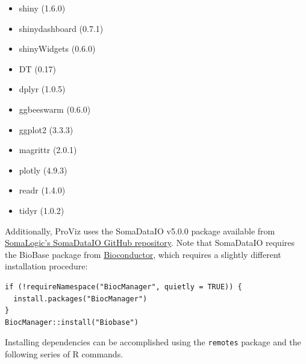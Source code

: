 \documentclass[
]{book}
\providecommand{\tightlist}{%
  \setlength{\itemsep}{0pt}\setlength{\parskip}{0pt}}
\begin{document}
\begin{itemize}
\tightlist
\item
  shiny (1.6.0)
\item
  shinydashboard (0.7.1)
\item
  shinyWidgets (0.6.0)
\item
  DT (0.17)
\item
  dplyr (1.0.5)
\item
  ggbeeswarm (0.6.0)
\item
  ggplot2 (3.3.3)
\item
  magrittr (2.0.1)
\item
  plotly (4.9.3)
\item
  readr (1.4.0)
\item
  tidyr (1.0.2)
\end{itemize}

Additionally, ProViz uses the SomaDataIO v5.0.0 package available from \href{https://github.com/SomaLogic/SomaDataIO}{SomaLogic's SomaDataIO GitHub repository}. Note that SomaDataIO requires the BioBase package from \href{https://bioconductor.org/}{Bioconductor}, which requires a slightly different installation procedure:

\begin{verbatim}
if (!requireNamespace("BiocManager", quietly = TRUE)) {
  install.packages("BiocManager")
}
BiocManager::install("Biobase")
\end{verbatim}

Installing dependencies can be accomplished using the \texttt{remotes} package and the following series of R commands.
\end{document}
